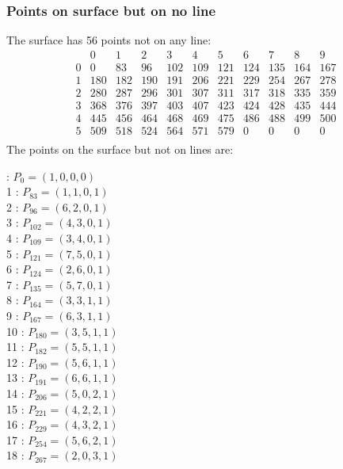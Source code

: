 \documentclass{article}
\begin{document}
{\subsubsection*{Points on surface but on no line}
The surface has 56 points not on any line:\\
$$
\begin{array}{r|*{10}{r}}
 & 0 & 1 & 2 & 3 & 4 & 5 & 6 & 7 & 8 & 9\\
\hline
0 & 0 & 83 & 96 & 102 & 109 & 121 & 124 & 135 & 164 & 167\\
1 & 180 & 182 & 190 & 191 & 206 & 221 & 229 & 254 & 267 & 278\\
2 & 280 & 287 & 296 & 301 & 307 & 311 & 317 & 318 & 335 & 359\\
3 & 368 & 376 & 397 & 403 & 407 & 423 & 424 & 428 & 435 & 444\\
4 & 445 & 456 & 464 & 468 & 469 & 475 & 486 & 488 & 499 & 500\\
5 & 509 & 518 & 524 & 564 & 571 & 579 & 0 & 0 & 0 & 0\\
\end{array}
$$
The points on the surface but not on lines are:\\
\begin{multicols}{2}
 : $P_{0}=( 1, 0, 0, 0 )$\\
1 : $P_{83}=( 1, 1, 0, 1 )$\\
2 : $P_{96}=( 6, 2, 0, 1 )$\\
3 : $P_{102}=( 4, 3, 0, 1 )$\\
4 : $P_{109}=( 3, 4, 0, 1 )$\\
5 : $P_{121}=( 7, 5, 0, 1 )$\\
6 : $P_{124}=( 2, 6, 0, 1 )$\\
7 : $P_{135}=( 5, 7, 0, 1 )$\\
8 : $P_{164}=( 3, 3, 1, 1 )$\\
9 : $P_{167}=( 6, 3, 1, 1 )$\\
10 : $P_{180}=( 3, 5, 1, 1 )$\\
11 : $P_{182}=( 5, 5, 1, 1 )$\\
12 : $P_{190}=( 5, 6, 1, 1 )$\\
13 : $P_{191}=( 6, 6, 1, 1 )$\\
14 : $P_{206}=( 5, 0, 2, 1 )$\\
15 : $P_{221}=( 4, 2, 2, 1 )$\\
16 : $P_{229}=( 4, 3, 2, 1 )$\\
17 : $P_{254}=( 5, 6, 2, 1 )$\\
18 : $P_{267}=( 2, 0, 3, 1 )$\\

\end{multicols}}
\end{document}
